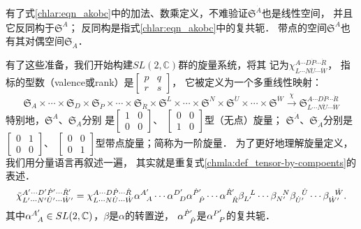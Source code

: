 有了式\eqref{chlar:eqn_akobc}中的加法、数乘定义，不难验证$\mathfrak{S}^{\dot{A}}$也是线性空间，
并且它{\kaishu 反同构}于$\mathfrak{S}^{A}$；
反同构是指式\eqref{chlar:eqn_akobc}中的复共轭．
带点的空间$\mathfrak{S}^{\dot{A}}$也有其对偶空间$\mathfrak{S}_{\dot{A}}$．

有了这些准备，我们开始构建$SL(2,\mathbb{C})$群的{\heiti 旋量系统}，将其
记为$\chi^{A\cdots D \dot{P}\cdots \dot{R}}_{L\cdots N \dot{U}\cdots \dot{W}}$，
指标的型数（valence或rank）是$\left[\begin{smallmatrix} p & q \\ r & s \end{smallmatrix}\right]$，
它被定义为一个多重线性映射：  %
\begin{equation*}
\mathfrak{S}_A\times \cdots \times \mathfrak{S}_D\times
\mathfrak{S}_{\dot{P}} \times \cdots \times\mathfrak{S}_{\dot{R}} \times 
\mathfrak{S}^L\times \cdots \times \mathfrak{S}^N\times
\mathfrak{S}^{\dot{U}} \times \cdots \times\mathfrak{S}^{\dot{W}} 
\xrightarrow{\chi}
\mathfrak{S}^{A\cdots D \dot{P}\cdots \dot{R}}_{L\cdots N \dot{U}\cdots \dot{W}} 
\end{equation*}
特别地，$\mathfrak{S}^{A}$、$\mathfrak{S}_{A}$分别
是$\left[\begin{smallmatrix} 1 & 0 \\ 0&0 \end{smallmatrix}\right]$、
$\left[\begin{smallmatrix} 0 &0\\ 1&0 \end{smallmatrix}\right]$型（无点）旋量；
$\mathfrak{S}^{\dot{A}}$、$\mathfrak{S}_{\dot{A}}$分别是
$\left[\begin{smallmatrix} 0&1 \\ 0&0 \end{smallmatrix}\right]$、
$\left[\begin{smallmatrix} 0&0 \\ 0&1 \end{smallmatrix}\right]$型带点旋量；简称为一阶旋量．
为了更好地理解旋量定义，我们用分量语言再叙述一遍，
其实就是重复式\eqref{chmla:def_tensor-by-compoents}的表述．
\setlength{\mathindent}{-1em}
\begin{equation}\label{chlar:eqn_spin-comp}
    \tilde{\chi}^{A'\cdots D' \dot{P}'\cdots \dot{R}'}_{L'\cdots N' \dot{U}'\cdots \dot{W}'}
    =\chi^{A\cdots D \dot{P}\cdots \dot{R}}_{L\cdots N \dot{U}\cdots \dot{W}}
    \alpha_{\hphantom{A} A}^{A'} \cdots \alpha_{\hphantom{A} D}^{D'}
    \alpha_{\hphantom{A} \dot{P}}^{\dot{P}'} \cdots \alpha_{\hphantom{A} \dot{R}}^{\dot{R}'}
    \beta^{\hphantom{A} L}_{L'} \cdots \beta^{\hphantom{A} N}_{N'}
    \beta^{\hphantom{A} \dot{U}}_{\dot{U}'} \cdots \beta^{\hphantom{A} \dot{W}}_{\dot{W}'} .
\end{equation}\setlength{\mathindent}{2em}
其中$\alpha_{\hphantom{A} A}^{A'}\in SL(2,\mathbb{C})$，$\beta$是$\alpha$的转置逆，
$\alpha_{\hphantom{A} \dot{P}}^{\dot{P}'}$是$\alpha_{\hphantom{A} {P}}^{{P}'}$的复共轭．

